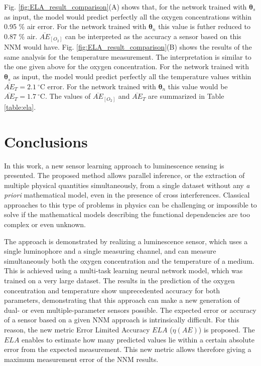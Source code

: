 \documentclass[final,5p,times,twocolumn]{elsarticle}
\begin{document}
Fig. \ref{fig:ELA_result_comparison}(A) shows that, for the network trained with ${\pmb \theta}_s$ as input, the model would predict perfectly all the oxygen concentrations within 0.95 \% air error. For the network trained with ${\pmb \theta}_n$ this value is futher reduced to 0.87 \% air. $\overline{AE}_{[O_2]}$ can be interpreted as the accuracy a sensor based on this NNM  would have.
Fig. \ref{fig:ELA_result_comparison}(B) shows the results of the same analysis for the temperature measurement. The interpretation is similar to the one given above for the oxygen concentration. For the network trained with ${\pmb \theta}_s$ as input, the model would predict perfectly all the temperature values within $\overline{AE}_{T}=2.1 \ ^\circ$C error. For the network trained with ${\pmb \theta}_n$ this value would be  $\overline{AE}_{T}=1.7 \ ^\circ$C. The values of $\overline{AE}_{[O_2]}$ and $\overline{AE}_{T}$ are summarized in Table \ref{table:ela}.



\section{Conclusions}

In this work, a new sensor learning approach to luminescence sensing is presented. The proposed method allows parallel inference, or the extraction of multiple physical quantities simultaneously, from a single dataset without any {\sl a priori} mathematical model, even in the presence of cross interferences. Classical approaches to this type of problems in physics can be challenging or impossible to solve if the mathematical models describing the functional dependencies are too complex or even unknown.

The approach is demonstrated by realizing a luminescence sensor, which uses a single luminophore and a single measuring channel, and can measure simultaneously both the oxygen concentration and the temperature of a medium. This is achieved using a multi-task learning neural network model, which was trained on a very large dataset. The results in the prediction of the oxygen concentration and temperature show unprecedented accuracy for both parameters, demonstrating that this approach can make a new generation of dual- or even multiple-parameter sensors possible.
The expected error or accuracy of a sensor based on a given NNM approach is intrinsically difficult. For this reason, the new metric Error Limited Accuracy $ELA$ ($\eta(AE)$) is proposed. The $ELA$ enables to estimate how many predicted values lie within a certain absolute error from the expected measurement. This new metric allows therefore giving a maximum measurement error of the NNM results.
\end{document}
